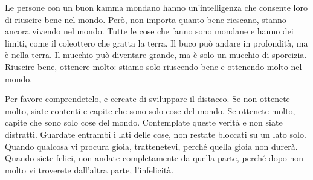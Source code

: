 Le persone con un buon kamma mondano hanno un'intelligenza che
consente loro di riuscire bene nel mondo. Però, non importa quanto bene
riescano, stanno ancora vivendo nel mondo. Tutte le cose che fanno sono
mondane e hanno dei limiti, come il coleottero che gratta la terra. Il
buco può andare in profondità, ma è nella terra. Il mucchio può
diventare grande, ma è solo un mucchio di sporcizia. Riuscire bene,
ottenere molto: stiamo solo riuscendo bene e ottenendo molto nel mondo.

Per favore comprendetelo, e cercate di sviluppare il distacco. Se non
ottenete molto, siate contenti e capite che sono solo cose del mondo. Se
ottenete molto, capite che sono solo cose del mondo. Contemplate queste
verità e non siate distratti. Guardate entrambi i lati delle cose, non
restate bloccati su un lato solo. Quando qualcosa vi procura gioia,
trattenetevi, perché quella gioia non durerà. Quando siete felici, non
andate completamente da quella parte, perché dopo non molto vi troverete
dall'altra parte, l'infelicità.

